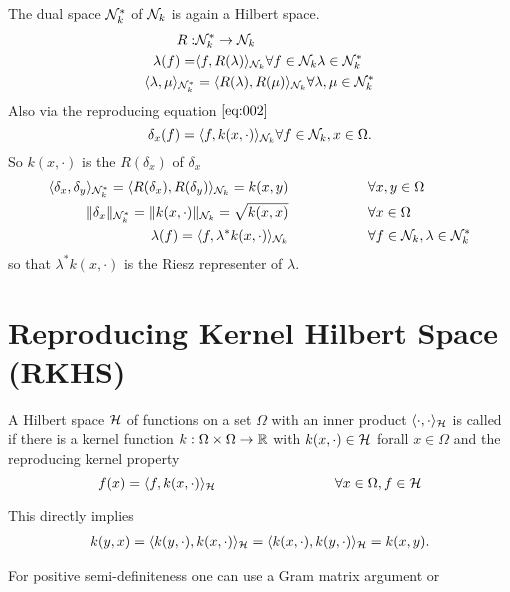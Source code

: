 The dual space $\mathcal{N}_k^*$ of $\mathcal{N}_k$ is again a Hilbert space.
\begin{align*}
    R:&\mathcal{N}_k^*\to\mathcal{N}_k\\
    \lambda(f)=&\langle f,R(\lambda)\rangle_{\mathcal{N}_k}\forall f\in \mathcal{N}_k \lambda\in \mathcal{N}_k^*\\
    \langle \lambda,\mu\rangle_{\mathcal{N}_k^*}&=\langle R(\lambda),R(\mu)\rangle_{\mathcal{N}_k}\forall \lambda,\mu\in \mathcal{N}_k^*
\end{align*}
Also via the reproducing equation $\ref{eq:002}$
\[\delta_x(f)=\langle f,k(x,\cdot)\rangle_{\mathcal{N}_k}\forall f\in\mathcal{N}_k,x\in\Omega.\]
So $k(x,\cdot)$ is the  $R(\delta_x)$ of $\delta_x$ 
\begin{align*}
    \langle \delta_x,\delta_y\rangle_{\mathcal{N}_k^*}=\langle R(\delta_x),R(\delta_y)\rangle_{\mathcal{N}_k}=k(x,y)\hspace{2cm}&\forall x,y\in\Omega  \\
    \Vert\delta_x\Vert_{\mathcal{N}_k^*}=\Vert k(x,\cdot)\Vert_{\mathcal{N}_k}=\sqrt{k(x,x)}\hspace{2cm}&\forall x\in\Omega\\
    \lambda(f)=\langle f,\lambda^*k(x,\cdot)\rangle_{\mathcal{N}_k}\hspace{2cm}&\forall f\in\mathcal{N}_k,\lambda\in \mathcal{N}_k^*
\end{align*}
so that $\lambda^* k(x,\cdot)$ is the Riesz representer of $\lambda$.

\section{Reproducing Kernel Hilbert Space (RKHS)}

\begin{definition}\label{def:RKHS}
    A Hilbert space $\mathcal{H}$ of functions on a set $\Omega$ with an inner product 
    $\langle\cdot,\cdot\rangle_{\mathcal{H}}$ is called  if there is a kernel
    function $k:\Omega\times\Omega\to\mathbb{R}$ with $k(x,\cdot)\in\mathcal{H}$ forall $x\in\Omega$ and 
    the reproducing kernel property 
    \[f(x)=\langle f,k(x,\cdot)\rangle_{\cH}\hspace{3cm}\forall x\in\Omega,f\in\cH\]
\end{definition}

This directly implies 
\begin{align*}
    k(y,x)=\langle k(y,\cdot),k(x,\cdot)\rangle_{\mathcal{H}}=\langle k(x,\cdot),k(y,\cdot)\rangle_{\mathcal{H}}=k(x,y).
\end{align*}

For positive semi-definiteness one can use a Gram matrix argument or 

